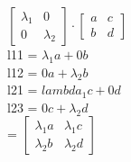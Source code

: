 \documentclass[12pt]{article}
\begin{document}
\begin{flushleft}
    $\begin{bmatrix}
            \lambda_{1} & 0           \\
            0           & \lambda_{2}
        \end{bmatrix} \cdot \begin{bmatrix}
            a & c \\
            b & d
        \end{bmatrix}$ \\
    l11 = $\lambda_{1}a  + 0b$ \\
    l12 = $0a  + \lambda_{2}b$ \\
    l21 = $lambda_{1}c  + 0d$ \\
    l23 = $0c  + \lambda_{2}d$ \\
    = $\begin{bmatrix}
            \lambda_{1}a & \lambda_{1}c \\
            \lambda_{2}b & \lambda_{2}d
        \end{bmatrix}$
\end{flushleft}
\end{document}
